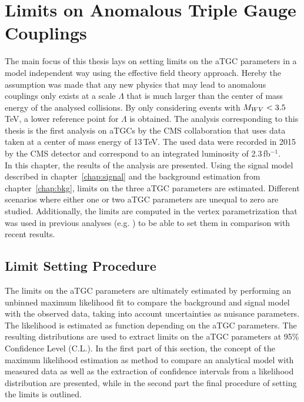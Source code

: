 \chapter{Limits on Anomalous Triple Gauge Couplings}
\label{chap:LimitsonATGCs}
The main focus of this thesis lays on setting limits on the aTGC parameters in a model independent way using the effective field theory approach. Hereby the assumption was made that any new physics that may lead to anomalous couplings only exists at a scale $\Lambda$ that is much larger than the center of mass energy of the analysed collisions. By only considering events with $M_{WV}<3.5$\,TeV, a lower reference point for $\Lambda$ is obtained. The analysis corresponding to this thesis \cite{PAS} is the first analysis on aTGCs by the CMS collaboration that uses data taken at a center of mass energy of 13\,TeV. The used data were recorded in 2015 by the CMS detector and correspond to an integrated luminosity of 2.3\,fb$^{-1}$.\\

\noindent In this chapter, the results of the analysis are presented. Using the signal model described in chapter~\ref{chap:signal} and the background estimation from chapter~\ref{chap:bkg}, limits on the three aTGC parameters are estimated. Different scenarios where either one or two aTGC parameters are unequal to zero are studied. Additionally, the limits are computed in the vertex parametrization that was used in previous analyses (e.g. \cite{aTGC1,aTGC2}) to be able to set them in comparison with recent results.

\section{Limit Setting Procedure}
The limits on the aTGC parameters are ultimately estimated by performing an unbinned maximum likelihood fit to compare the background and signal model with the observed data, taking into account uncertainties as nuisance parameters. The likelihood is estimated as function depending on the aTGC parameters. The resulting distributions are used to extract limits on the aTGC parameters at 95\% Confidence Level (C.L.). In the first part of this section, the concept of the maximum likelihood estimation as method to compare an analytical model with measured data as well as the extraction of confidence intervals from a likelihood distribution are presented, while in the second part the final procedure of setting the limits is outlined.
